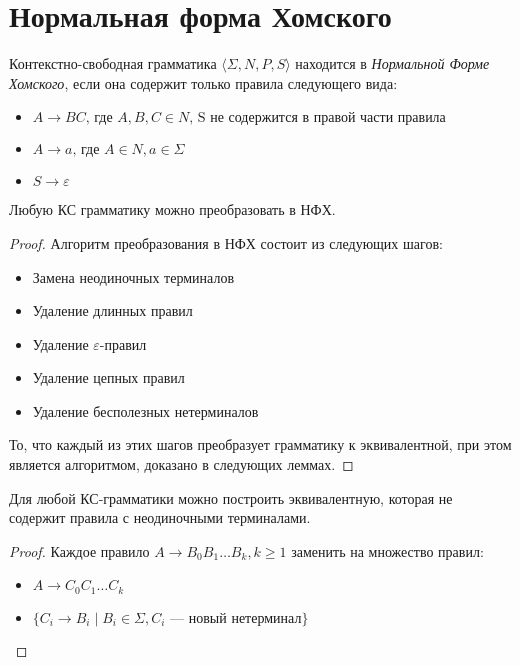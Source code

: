 \section{Нормальная форма Хомского}
\label{section:CNF}

\begin{definition}
Контекстно-свободная грамматика $\langle \Sigma, N, P, S\rangle$ находится в \textit{Нормальной Форме Хомского}, если она содержит только правила следующего вида:

\begin{itemize}
  \item $A \to B C \text{, где } A, B, C \in N \text{, S не содержится в правой части правила }$
  \item $A \to a \text{, где } A \in N, a \in \Sigma$
  \item $S \to \varepsilon$
\end{itemize}
\end{definition}

\begin{theorem}
Любую КС грамматику можно преобразовать в НФХ.
\end{theorem}

\begin{proof}
  Алгоритм преобразования в НФХ состоит из следующих шагов:

  \begin{itemize}
    \item Замена неодиночных терминалов
    \item Удаление длинных правил
    \item Удаление $\varepsilon$-правил
    \item Удаление цепных правил
    \item Удаление бесполезных нетерминалов
  \end{itemize}

  То, что каждый из этих шагов преобразует грамматику к эквивалентной, при этом является алгоритмом, доказано в следующих леммах.
\end{proof}

\begin{lemma}
  Для любой КС-грамматики можно построить эквивалентную, которая не содержит правила с неодиночными терминалами.
\end{lemma}

\begin{proof}
  Каждое правило $A \to B_0 B_1 \dots B_k, k \geq 1$ заменить на множество правил:
  \begin{itemize}
    \item $A \to C_0 C_1 \dots C_k$
    \item $\{ C_i \to B_i \mid B_i \in \Sigma, C_i \text{ --- новый нетерминал} \}$
  \end{itemize}
\end{proof}

